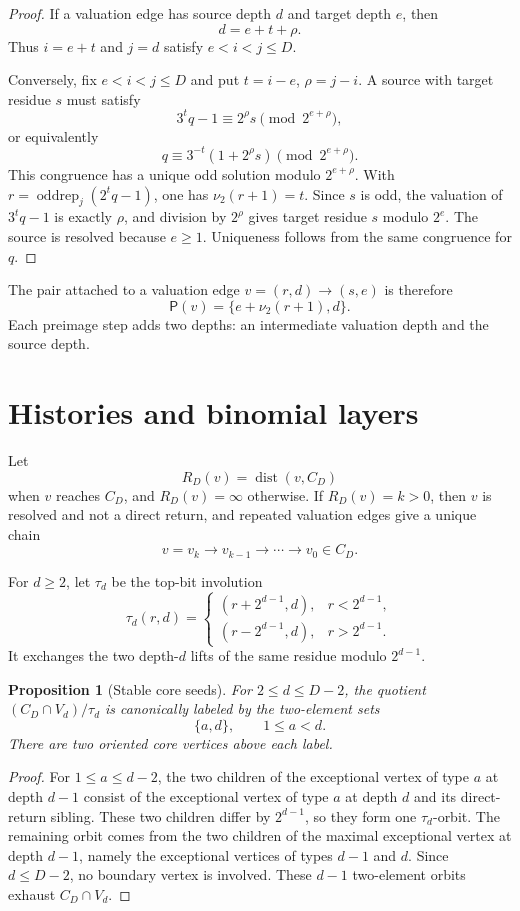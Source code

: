 \documentclass[11pt]{amsart}
\newtheorem{proposition}[theorem]{Proposition}
\theoremstyle{definition}
\theoremstyle{remark}
\newcommand{\nuu}{\nu_2}
\newcommand{\dist}{\operatorname{dist}}
\newcommand{\oddrep}{\operatorname{oddrep}}
\newcommand{\Pair}{\mathsf P}
\begin{document}
\begin{proof}
If a valuation edge has source depth $d$ and target depth $e$, then
\[
d=e+t+\rho.
\]
Thus $i=e+t$ and $j=d$ satisfy $e<i<j\le D$.

Conversely, fix $e<i<j\le D$ and put $t=i-e$, $\rho=j-i$.  A source
with target residue $s$ must satisfy
\[
3^tq-1\equiv2^\rho s\pmod {2^{e+\rho}},
\]
or equivalently
\[
q\equiv3^{-t}(1+2^\rho s)\pmod {2^{e+\rho}}.
\]
This congruence has a unique odd solution modulo $2^{e+\rho}$.  With
$r=\oddrep_j(2^tq-1)$, one has $\nuu(r+1)=t$.  Since $s$ is odd, the
valuation of $3^tq-1$ is exactly $\rho$, and division by $2^\rho$
gives target residue $s$ modulo $2^e$.  The source is resolved because
$e\ge1$.  Uniqueness follows from the same congruence for $q$.
\end{proof}

The pair attached to a valuation edge $v=(r,d)\to(s,e)$ is therefore
\[
\Pair(v)=\{e+\nuu(r+1),d\}.
\]
Each preimage step adds two depths: an intermediate valuation depth and
the source depth.

\section{Histories and binomial layers}\label{sec:histories}
Let
\[
R_D(v)=\dist(v,C_D)
\]
when $v$ reaches $C_D$, and $R_D(v)=\infty$ otherwise.  If
$R_D(v)=k>0$, then $v$ is resolved and not a direct return, and
repeated valuation edges give a unique chain
\[
v=v_k\to v_{k-1}\to\cdots\to v_0\in C_D.
\]


For $d\ge2$, let $\tau_d$ be the top-bit involution
\[
\tau_d(r,d)=
\begin{cases}
(r+2^{d-1},d),&r<2^{d-1},\\
(r-2^{d-1},d),&r>2^{d-1}.
\end{cases}
\]
It exchanges the two depth-$d$ lifts of the same residue modulo $2^{d-1}$.

\begin{proposition}[Stable core seeds]\label{prop:seeds}
For $2\le d\le D-2$, the quotient $(C_D\cap V_d)/\tau_d$ is canonically labeled by the two-element sets
\[
\{a,d\},\qquad 1\le a<d.
\]
There are two oriented core vertices above each label.
\end{proposition}

\begin{proof}
For $1\le a\le d-2$, the two children of the exceptional vertex of type $a$ at depth $d-1$ consist of the exceptional vertex of type $a$ at depth $d$ and its direct-return sibling.  These two children differ by $2^{d-1}$, so they form one $\tau_d$-orbit.  The remaining orbit comes from the two children of the maximal exceptional vertex at depth $d-1$, namely the exceptional vertices of types $d-1$ and $d$.  Since $d\le D-2$, no boundary vertex is involved.  These $d-1$ two-element orbits exhaust $C_D\cap V_d$.
\end{proof}
\end{document}
